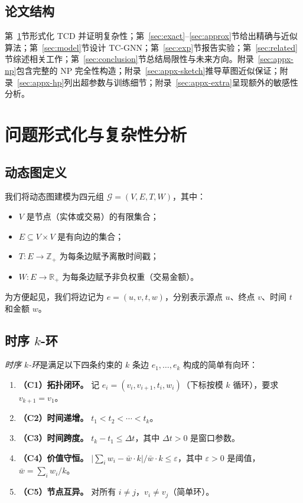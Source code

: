 \documentclass[journal,onecolumn]{IEEEtran}
\newcommand{\R}{\mathbb{R}}
\newcommand{\G}{\mathcal{G}}
\newcommand{\eps}{\varepsilon}
\begin{document}
\subsection{论文结构}
\label{sec:intro-roadmap}

第~\ref{sec:theory}节形式化 TCD 并证明复杂性；第~\ref{sec:exact}--\ref{sec:approx}节给出精确与近似算法；第~\ref{sec:model}节设计 TC-GNN；第~\ref{sec:exp}节报告实验；第~\ref{sec:related}节综述相关工作；第~\ref{sec:conclusion}节总结局限性与未来方向。附录~\ref{sec:appx-np}包含完整的 NP 完全性构造；附录~\ref{sec:appx-sketch}推导草图近似保证；附录~\ref{sec:appx-hp}列出超参数与训练细节；附录~\ref{sec:appx-extra}呈现额外的敏感性分析。

\section{问题形式化与复杂性分析}
\label{sec:theory}

\subsection{动态图定义}
\label{sec:theory-graph}

我们将动态图建模为四元组 $\G = (V, E, T, W)$，其中：
\begin{itemize}
\item $V$ 是节点（实体或交易）的有限集合；
\item $E \subseteq V \times V$ 是有向边的集合；
\item $T: E \to \mathbb{Z}_{+}$ 为每条边赋予离散时间戳；
\item $W: E \to \R_{+}$ 为每条边赋予非负权重（交易金额）。
\end{itemize}
为方便起见，我们将边记为 $e = (u, v, t, w)$，分别表示源点 $u$、终点 $v$、时间 $t$ 和金额 $w$。

\subsection{时序 $k$-环}
\label{sec:theory-cycle}

\emph{时序 $k$-环}是满足以下四条约束的 $k$ 条边 $e_1, \dots, e_k$ 构成的简单有向环：
\begin{enumerate}
\item \textbf{（C1）拓扑闭环。} 记 $e_i = (v_i, v_{i+1}, t_i, w_i)$（下标按模 $k$ 循环），要求 $v_{k+1} = v_1$。
\item \textbf{（C2）时间递增。} $t_1 < t_2 < \cdots < t_k$。
\item \textbf{（C3）时间跨度。} $t_k - t_1 \leq \Delta t$，其中 $\Delta t > 0$ 是窗口参数。
\item \textbf{（C4）价值守恒。}
$\bigl|\sum_i w_i - \bar{w} \cdot k\bigr| / \bar{w} \cdot k \leq \eps$，其中 $\eps > 0$ 是阈值，$\bar{w} = \sum_i w_i / k$。
\item \textbf{（C5）节点互异。} 对所有 $i \neq j$，$v_i \neq v_j$（简单环）。
\end{enumerate}
\end{document}
